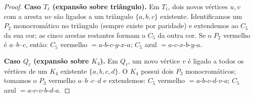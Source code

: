 \documentclass[reqno, 12pt]{amsart}
\numberwithin{equation}{section}
\theoremstyle{plain}
\theoremstyle{definition}
\begin{document}
\begin{proof}
\medskip
\noindent\textbf{Caso $T_\ell$ (expansão sobre triângulo).}
Em $T_\ell$, dois novos vértices $u, v$ com a aresta $uv$ são ligados a um triângulo $\{a,b,c\}$ existente.
Identificamos um $P_2$ monocromático no triângulo (sempre existe por paridade) e extendemos
ao $C_5$ da sua cor; as cinco arestas restantes formam o $C_5$ da outra cor.
Se o $P_2$ vermelho é $a$--$b$--$c$, então: $C_5$ vermelho $= a\text{-}b\text{-}c\text{-}y\text{-}x\text{-}a$;
$C_5$ azul $= a\text{-}c\text{-}x\text{-}b\text{-}y\text{-}a$.

\medskip
\begin{center}
\end{center}
\medskip
\noindent\textbf{Caso $Q_\ell$ (expansão sobre $K_4$).}
Em $Q_\ell$, um novo vértice $v$ é ligado a todos os vértices de um $K_4$ existente $\{a,b,c,d\}$.
O $K_4$ possui dois $P_3$ monocromáticos; tomamos o $P_3$ vermelho $a$--$b$--$c$--$d$ e extendemos:
$C_5$ vermelho $= a\text{-}b\text{-}c\text{-}d\text{-}v\text{-}a$;
$C_5$ azul $= a\text{-}c\text{-}v\text{-}b\text{-}d\text{-}a$.


\end{proof}
\end{document}
